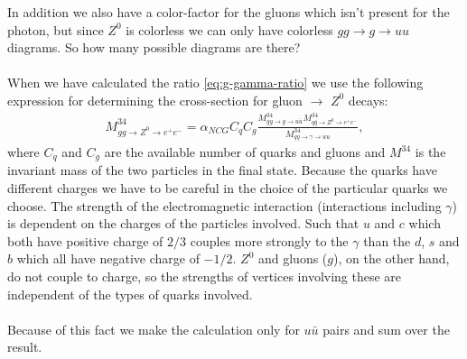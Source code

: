 In addition we also have a color-factor for the gluons which isn't present for the photon, but since $Z^0$ is colorless we can only have colorless $gg \rightarrow g \rightarrow uu$ diagrams. So how many possible diagrams are there?
\\ \\
When we have calculated the ratio \eqref{eq:g-gamma-ratio} we use the following expression for determining the cross-section for gluon $\rightarrow$ $Z^0$ decays:
\begin{align}
	M^{34}_{gg \rightarrow Z^0 \rightarrow e^+e^-} = \alpha_{NCG} C_q C_g \frac{M^{34}_{gg \rightarrow g \rightarrow u\bar{u}} M^{34}_{q\bar{q} \rightarrow Z^0 \rightarrow e^+e^-}} {M^{34}_{qq \rightarrow \gamma \rightarrow uu}},
\end{align}
where $C_q$ and $C_g$ are the available number of quarks and gluons and $M^{34}$ is the invariant mass of the two particles in the final state. Because the quarks have different charges we have to be careful in the choice of the particular quarks we choose. The strength of the electromagnetic interaction (interactions including $\gamma$) is dependent on the charges of the particles involved. Such that $u$ and $c$ which both have positive charge of $2/3$ couples more strongly to the $\gamma$ than the $d$, $s$ and $b$ which all have negative charge of $-1/2$. $Z^0$ and gluons ($g$), on the other hand, do not couple to charge, so the strengths of vertices involving these are independent of the types of quarks involved.
\\ \\
Because of this fact we make the calculation only for $u\bar{u}$ pairs and sum over the result.
